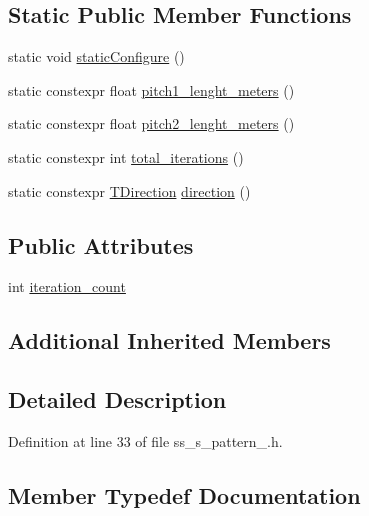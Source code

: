 \subsection*{Static Public Member Functions}
\begin{DoxyCompactItemize}
\item 
static void \hyperlink{structsm__dance__bot_1_1SS5_1_1SsSPattern1_a203b4e61bea71a82f1b56b19ac25bf59}{static\+Configure} ()
\item 
static constexpr float \hyperlink{structsm__dance__bot_1_1SS5_1_1SsSPattern1_a32bf83535c603665005956c1a8cf71a7}{pitch1\+\_\+lenght\+\_\+meters} ()
\item 
static constexpr float \hyperlink{structsm__dance__bot_1_1SS5_1_1SsSPattern1_a5e923410f8aad0bdc57cf689e8cf1408}{pitch2\+\_\+lenght\+\_\+meters} ()
\item 
static constexpr int \hyperlink{structsm__dance__bot_1_1SS5_1_1SsSPattern1_a85e3580f9375fde963ea4204305ad27d}{total\+\_\+iterations} ()
\item 
static constexpr \hyperlink{namespacesm__dance__bot_1_1SS5_aaa01c87b9245bbff2b581cefd6f3b346}{T\+Direction} \hyperlink{structsm__dance__bot_1_1SS5_1_1SsSPattern1_abe6ab6e7e6630e67566c0fee58ce565f}{direction} ()
\end{DoxyCompactItemize}
\subsection*{Public Attributes}
\begin{DoxyCompactItemize}
\item 
int \hyperlink{structsm__dance__bot_1_1SS5_1_1SsSPattern1_ac1b4a50a642face1106fd58d026067ac}{iteration\+\_\+count}
\end{DoxyCompactItemize}
\subsection*{Additional Inherited Members}


\subsection{Detailed Description}


Definition at line 33 of file ss\+\_\+s\+\_\+pattern\+\_.\+h.



\subsection{Member Typedef Documentation}
